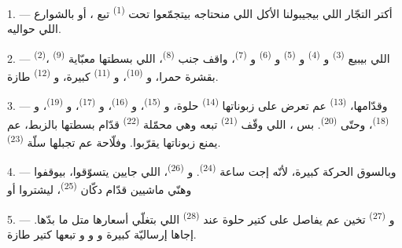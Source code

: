 \VUsaut{4.0mm}
\VUsaut{3.0mm}

\VUsaut{3.0mm}

1. --- أكتر التجّار اللي بيجيبولنا الأكل اللي منحتاجه بيتجمّعوا تحت
 \textsuperscript{(1)} تبع ، أو
بالشوارع اللي حواليه.

2. ---  \textsuperscript{(2)}، اللي بيبيع
 \textsuperscript{(3)} و
\textsuperscript{(4)} و \textsuperscript{(5)}
و \textsuperscript{(6)} و
\textsuperscript{(7)}، واقف جنب 
\textsuperscript{(8)}، اللي بسطتها معبّاية 
\textsuperscript{(9)} بقشرة حمرا، و
\textsuperscript{(10)}، و \textsuperscript{(11)}
كبيرة، و \textsuperscript{(12)} طازة.

3. --- وقدّامها،  \textsuperscript{(13)} عم تعرض
على زبوناتها  \textsuperscript{(14)} حلوة،
و \textsuperscript{(15)}، و
\textsuperscript{(16)}، و \textsuperscript{(17)}،
و \textsuperscript{(19)}، و
\textsuperscript{(18)}، وحتّى  \textsuperscript{(20)}. بس
، اللي وقّف 
\textsuperscript{(21)} تبعه وهي محمّلة 
\textsuperscript{(22)} قدّام بسطتها بالزبط، عم يمنع زبوناتها يقرّبوا.
وفلّاحة عم تجبلها سلّة  \textsuperscript{(23)}.

\VUsaut{4.0mm}
\VUsaut{3.0mm}

4. --- وبالسوق الحركة كبيرة، لأنّه إجت ساعة 
\textsuperscript{(24)}. و \textsuperscript{(26)}،
اللي جايين يتسوّقوا، بيوقفوا وهنّي ماشيين قدّام دكّان  \textsuperscript{(25)}، ليشتروا  أو 

5. --- و \textsuperscript{(27)} تخين عم يفاصل على
 كتير حلوة عند  \textsuperscript{(28)}
اللي بتغلّي أسعارها متل ما بدّها. إجاها إرساليّة كبيرة
 و و
و تبعها كتير طازة.

\VUsaut{4.0mm}
\VUsaut{3.0mm}

